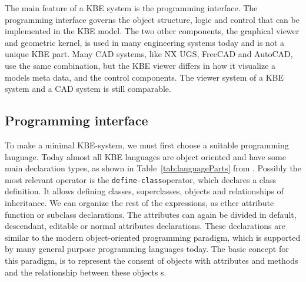 The main feature of a KBE system is the programming interface. The programming interface governs the object structure, logic and control that can be implemented in the KBE model. The two other components, the graphical viewer and geometric kernel, is used in many engineering systems today and is not a unique KBE part. Many CAD systems, like NX UGS, FreeCAD and AutoCAD, use the same combination, but the KBE viewer differs in how it visualize a models meta data, and the control components. The viewer system of a KBE system and a CAD system is still comparable.


\subsection{Programming interface} %
\label{sub:programming_interface}
To make a minimal KBE-system, we must first choose a suitable programming language. Today almost all KBE languages are object oriented and have some main declaration types, as shown in Table~\ref{tab:languageParts} from \cite{rocca}. Possibly the most relevant operator is the \texttt{define-class}operator, which declares a class definition. It allows defining classes, superclasses, objects and relationships of inheritance. We can organize the rest of the expressions, as ether attribute function or subclass declarations. The attributes can again be divided in default, descendant, editable or normal attributes declarations. These declarations are similar to the modern object-oriented programming paradigm, which is supported by many general purpose programming languages today. The basic concept for this paradigm, is to represent the consent of objects with attributes and methods and the relationship between these objects \citep{van_ray}s.

